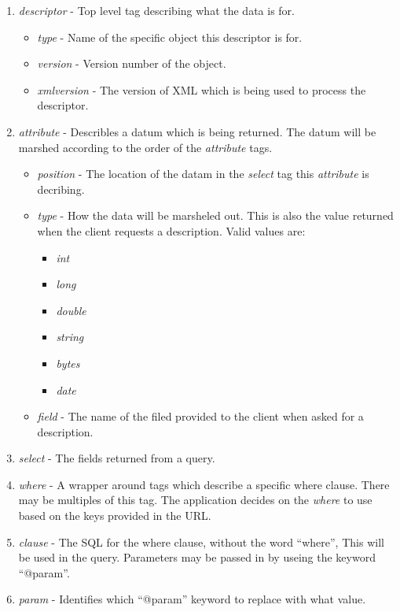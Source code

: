 \begin{enumerate}
\item \emph{descriptor} - Top level tag describing what the data is for.
\begin{itemize}
\item \emph{type} - Name of the specific object this descriptor is for.
\item \emph{version} - Version number of the object.
\item \emph{xmlversion} - The version of XML which is being used to process the descriptor.
\end{itemize}
\item \emph{attribute} - Describles a datum which is being returned. The datum will be marshed 
according to the order of the \emph{attribute} tags.
\begin{itemize}
\item \emph{position} - The location of the datam in the \emph{select} tag this \emph{attribute}
is decribing.
\item \emph{type} - How the data will be marsheled out.  This is also the value returned when 
the client requests a description.  Valid values are:
\begin{itemize}
\item \emph{int}
\item \emph{long}
\item \emph{double}
\item \emph{string}
\item \emph{bytes}
\item \emph{date}
\end{itemize}
\item \emph{field} - The name of the filed provided to the client when asked for a description.
\end{itemize}
\item \emph{select} - The fields returned from a query.
\item \emph{where} - A wrapper around tags which describe a specific where clause.  There may be 
multiples of this  tag.  The application decides on the \emph{where} to use based on the keys 
provided in the URL.
\item \emph{clause} - The SQL for the where clause, without the word ``where'', This will be used 
in the query.  Parameters may be passed in by useing the keyword ``@param''.  
\item \emph{param} - Identifies which ``@param'' keyword to replace with what value.
\begin{itemize}

\end{itemize}
\end{enumerate}

